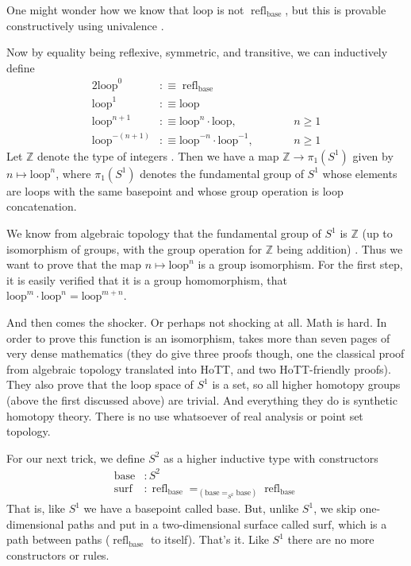 \documentclass[11pt]{article}
\DeclareMathOperator{\refl}{refl}
\newcommand{\sloop}{\text{loop}}
\newcommand{\sbase}{\text{base}}
\newcommand{\ssurf}{\text{surf}}
\newcommand{\ints}{\mathbb{Z}}
\begin{document}
One might wonder how we know that $\sloop$ is not $\refl_\sbase$,
but this is provable constructively using univalence
.

Now by equality being reflexive, symmetric, and transitive, we can
inductively define
\begin{alignat*}{2}
   \sloop^0 & :\equiv \refl_\sbase
   \\
   \sloop^1 & :\equiv \sloop
   \\
   \sloop^{n + 1} & :\equiv \sloop^n \cdot \sloop,
        & \qquad & n \ge 1
   \\
   \sloop^{- (n + 1)} & :\equiv \sloop^{- n} \cdot \sloop^{-1},
        & \qquad & n \ge 1
\end{alignat*}
Let $\ints$ denote the type of integers .  Then we have a map
$\ints \to \pi_1(S^1)$ given by $n \mapsto \sloop^n$, where $\pi_1(S^1)$
denotes the fundamental group of $S^1$ whose elements are loops with the
same basepoint and whose group operation is loop concatenation.

We know from algebraic topology that the fundamental group of $S^1$ is $\ints$
(up to isomorphism of groups, with the group operation for $\ints$ being
addition) .  Thus we want to prove that
the map $n \mapsto \sloop^n$ is a group isomorphism.
For the first step, it is easily verified that it is a group homomorphism,
that $\sloop^m \cdot \sloop^n = \sloop^{m + n}$.

And then comes the shocker.  Or perhaps not shocking at all.  Math is hard.
In order to prove this function is an isomorphism,
 takes more than seven pages of very dense
mathematics (they do give three proofs though, one the classical
proof from algebraic topology translated into HoTT,
and two HoTT-friendly proofs).
They also prove that the loop space of $S^1$ is a set, so all higher homotopy
groups (above the first discussed above) are trivial.
And everything they do is synthetic homotopy theory.
There is no use whatsoever of real analysis or point set topology.

For our next trick, we define $S^2$ as a higher inductive type
with constructors
\begin{align*}
   \sbase & : S^2
   \\
   \ssurf & : \refl_\sbase =_{\left(\sbase =_{S^2} \sbase\right)} \refl_\sbase
\end{align*}
That is, like $S^1$ we have a basepoint called $\sbase$.
But, unlike $S^1$, we skip one-dimensional paths and put in a two-dimensional
surface called $\ssurf$, which is a path between paths ($\refl_\sbase$ to
itself).  That's it.  Like $S^1$ there are no more constructors or rules.
\end{document}
